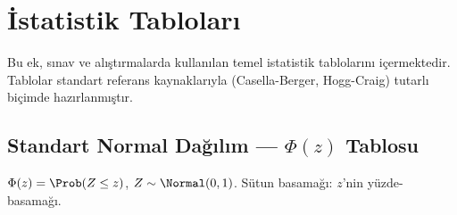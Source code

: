 \chapter{İstatistik Tabloları}
\label{app:istatistik_tablolari}

Bu ek, sınav ve alıştırmalarda kullanılan temel istatistik tablolarını içermektedir. Tablolar standart referans kaynaklarıyla (Casella-Berger, Hogg-Craig) tutarlı biçimde hazırlanmıştır.

\section{Standart Normal Dağılım --- $\Phi(z)$ Tablosu}
\label{app:normal_tablo}

$\Phi(z) = \Prob(Z\leq z)$, $Z\sim\Normal(0,1)$. Sütun basamağı: $z$'nin yüzde-basamağı.

